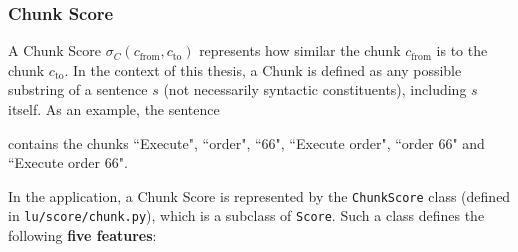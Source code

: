 \subsubsection{Chunk Score} \label{ch:arch:LU:scores:chunk}
A Chunk Score $\sigma_C(c_\text{from},c_\text{to})$ represents how similar the chunk $c_\text{from}$ is to the chunk $c_\text{to}$. In the context of this thesis, a Chunk is defined as any possible substring of a sentence $s$ (not necessarily syntactic constituents), including $s$ itself. As an example, the sentence 

 contains the chunks ``Execute", ``order", ``66", ``Execute order", ``order 66" and ``Execute order 66".

In the application, a Chunk Score is represented by the \texttt{ChunkScore} class (defined in \texttt{lu/score/chunk.py}), which is a subclass of \texttt{Score}. Such a class defines the following \textbf{five features}:
